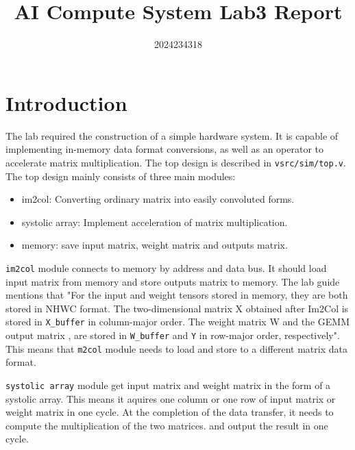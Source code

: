 \documentclass[conference]{IEEEtran}
\begin{document}
\title{AI Compute System Lab3 Report\\
}

\author{ 2024234318}

\maketitle


\section{Introduction}

The lab required the construction of a simple hardware system.
It is capable of implementing in-memory data format conversions,
as well as an operator to accelerate matrix multiplication.
The top design is described in \verb|vsrc/sim/top.v|.
The top design mainly consists of three main modules:

\begin{itemize}
    \item im2col: Converting ordinary matrix into easily convoluted forms.
    \item systolic array: Implement acceleration of matrix multiplication.
    \item memory: save input matrix, weight matrix and outputs matrix.
\end{itemize}

\verb|im2col| module connects to memory by address and data bus.
It should load input matrix from memory and store outputs matrix to memory.
The lab guide mentions that "For the input and weight tensors stored in memory, they are both stored in NHWC format.
The two-dimensional matrix X obtained after Im2Col is stored in \verb|X_buffer| in column-major order.
The weight matrix W and the GEMM output matrix ,
are stored in \verb|W_buffer| and \verb|Y| in row-major order, respectively".
This means that \verb|m2col| module needs to load and store to a different matrix data format.

\verb|systolic array| module get input matrix and weight matrix in the form of a systolic array.
This means it aquires one column or one row of input matrix or weight matrix in one cycle.
At the completion of the data transfer, it needs to compute the multiplication of the two matrices.
and output the result in one cycle.
\end{document}
